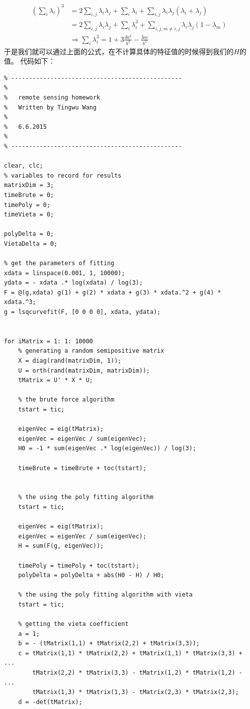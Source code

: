 \documentclass{article}
\begin{document}
\begin{equation}
\begin{aligned}
(\sum_i\lambda_i)^3 &= 2\sum_{i,j}\lambda_i\lambda_j + \sum_i\lambda_i + \sum_{i,j}\lambda_i\lambda_j(\lambda_i+\lambda_j) \\
& = 2\sum_{i,j}\lambda_i\lambda_j + \sum_i\lambda_i^3 + \sum_{i,j,m\neq i,j}\lambda_i\lambda_j(1 - \lambda_m)\\
&\Rightarrow \sum_i\lambda_i^3 = 1 + 3 \frac{da^2}{b^3} - \frac{3ac}{b^2}
\end{aligned}
\end{equation}
于是我们就可以通过上面的公式，在不计算具体的特征值的时候得到我们的\(H\)的值。
代码如下：
\begin{lstlisting}
% ------------------------------------------------
%
%   remote sensing homework
%   Written by Tingwu Wang
%
%   6.6.2015
%
% ------------------------------------------------

clear, clc;
% variables to record for results
matrixDim = 3;
timeBrute = 0;
timePoly = 0;
timeVieta = 0;

polyDelta = 0;
VietaDelta = 0;

% get the parameters of fitting
xdata = linspace(0.001, 1, 10000);
ydata = - xdata .* log(xdata) / log(3);
F = @(g,xdata) g(1) + g(2) * xdata + g(3) * xdata.^2 + g(4) * xdata.^3;
g = lsqcurvefit(F, [0 0 0 0], xdata, ydata);


for iMatrix = 1: 1: 10000
    % generating a random semipositive matrix
    X = diag(rand(matrixDim, 1));
    U = orth(rand(matrixDim, matrixDim));
    tMatrix = U' * X * U;
    
    % the brute force algorithm
    tstart = tic;

    eigenVec = eig(tMatrix);
    eigenVec = eigenVec / sum(eigenVec);
    H0 = -1 * sum(eigenVec .* log(eigenVec)) / log(3);
    
    timeBrute = timeBrute + toc(tstart);
    
    
    % the using the poly fitting algorithm
    tstart = tic;

    eigenVec = eig(tMatrix);
    eigenVec = eigenVec / sum(eigenVec);
    H = sum(F(g, eigenVec));
    
    timePoly = timePoly + toc(tstart);
    polyDelta = polyDelta + abs(H0 - H) / H0;
    
    % the using the poly fitting algorithm with vieta
    tstart = tic;
    
    % getting the vieta coefficient
    a = 1;
    b = - (tMatrix(1,1) + tMatrix(2,2) + tMatrix(3,3));
    c = tMatrix(1,1) * tMatrix(2,2) + tMatrix(1,1) * tMatrix(3,3) + ...
        tMatrix(2,2) * tMatrix(3,3) - tMatrix(1,2) * tMatrix(1,2) - ...
        tMatrix(1,3) * tMatrix(1,3) - tMatrix(2,3) * tMatrix(2,3);
    d = -det(tMatrix);


\end{lstlisting}
\end{document}
